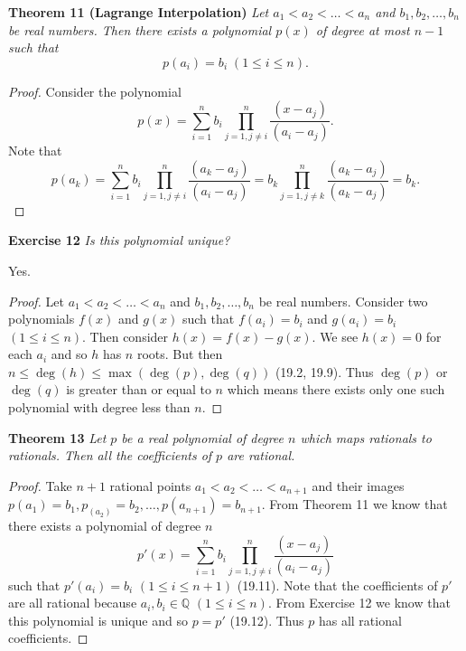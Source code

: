 \documentclass{article}
\begin{document}
\begin{flushleft}
\textbf{Theorem 11 (Lagrange Interpolation)}
\textsl{Let $a_1 < a_2 < \dots < a_n$ and $b_1, b_2, \dots , b_n$ be real numbers. Then there exists a polynomial $p(x)$ of degree at most $n-1$ such that
\[
p(a_i) = b_i \; (1 \leq i \leq n).
\]}
\begin{proof}
Consider the polynomial
\[
p(x) = \sum_{i=1}^n b_i \prod_{j=1, j \neq i}^n \frac{(x-a_j)}{(a_i-a_j)}.
\]
Note that
\[
p(a_k) = \sum_{i=1}^n b_i \prod_{j=1, j \neq i}^n \frac{(a_k-a_j)}{(a_i-a_j)} = b_k \prod_{j=1, j \neq k}^n \frac{(a_k-a_j)}{(a_k-a_j)} = b_k.
\]
\end{proof}

\textbf{Exercise 12}
\textsl{Is this polynomial unique?}\newline

Yes.
\begin{proof}
Let $a_1 < a_2 < \dots < a_n$ and $b_1, b_2, \dots , b_n$ be real numbers. Consider two polynomials $f(x)$ and $g(x)$ such that $f(a_i) = b_i$ and $g(a_i) = b_i$ $(1 \leq i \leq n)$. Then consider $h(x) = f(x) - g(x)$. We see $h(x) = 0$ for each $a_i$ and so $h$ has $n$ roots. But then $n \leq \deg(h) \leq \max(\deg(p), \deg(q))$ (19.2, 19.9). Thus $\deg(p)$ or $\deg(q)$ is greater than or equal to $n$ which means there exists only one such polynomial with degree less than $n$.
\end{proof}

\textbf{Theorem 13}
\textsl{Let $p$ be a real polynomial of degree $n$ which maps rationals to rationals. Then all the coefficients of $p$ are rational.}
\begin{proof}
Take $n+1$ rational points $a_1 < a_2 < \dots < a_{n+1}$ and their images $p(a_1) = b_1, p_(a_2) = b_2, \dots , p(a_{n+1}) = b_{n+1}$. From Theorem 11 we know that there exists a polynomial of degree $n$
\[
p'(x) = \sum_{i=1}^n b_i \prod_{j=1, j \neq i}^n \frac{(x-a_j)}{(a_i-a_j)}
\]
such that $p'(a_i) = b_i$ $(1 \leq i \leq n+1)$ (19.11). Note that the coefficients of $p'$ are all rational because $a_i,b_i \in \mathbb{Q}$ $(1 \leq i \leq n)$. From Exercise 12 we know that this polynomial is unique and so $p=p'$ (19.12). Thus $p$ has all rational coefficients.
\end{proof}

\end{flushleft}
\end{document}
